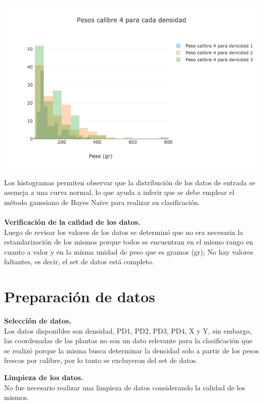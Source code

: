 \begin{center}
\includegraphics[scale=0.6]{PD4.png}
\end{center}

Los histogramas permiten observar que la distribución de los datos de entrada se asemeja a
una curva normal, lo que ayuda a inferir que se debe emplear el método gaussiano de
Bayes Naive para realizar su clasificación.\\\\

\noindent
\textbf{Verificación de la calidad de los datos.}\\

Luego de revisar los valores de los datos se determinó que no era necesaria la estandarización
de los mismos porque todos se encuentran en el mismo rango en cuanto a valor y en la misma unidad
de peso que es gramos (gr); No hay valores faltantes, es decir, el set de datos está completo.

\section{Preparación de datos}

\noindent
\textbf{Selección de datos.}\\

Los datos disponibles son densidad, PD1, PD2, PD3, PD4, X y Y, sin embargo, las coordenadas de las
plantas no son un dato relevante para la clasificación que se realizó porque la misma busca determinar
la densidad solo a partir de los pesos frescos por calibre, por lo tanto se excluyeron del set de datos.

\noindent
\textbf{Limpieza de los datos.}\\

No fue necesario realizar una limpieza de datos considerando la calidad de los mismos.\\

